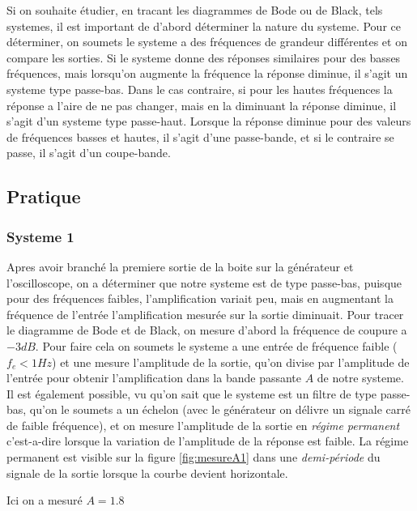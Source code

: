 \documentclass[12pt, a4paper]{report}
\begin{document}
Si on souhaite étudier, en tracant les diagrammes de Bode ou de Black, tels
systemes, il est important de d'abord déterminer la nature du systeme. Pour ce 
déterminer, on soumets le systeme a des fréquences de grandeur différentes et on
compare les sorties. Si le systeme donne des réponses similaires pour des basses fréquences,
mais lorsqu'on augmente la fréquence la réponse diminue, il s'agit un systeme type passe-bas. Dans le cas contraire,
si pour les hautes fréquences la réponse a l'aire de ne pas changer, mais en la diminuant la réponse diminue, il s'agit d'un systeme type
passe-haut. Lorsque la réponse diminue pour des valeurs de fréquences basses et hautes, il s'agit d'une passe-bande,
et si le contraire se passe, il s'agit d'un coupe-bande.

\subsection{Pratique}
\subsubsection{Systeme 1}

Apres avoir branché la premiere sortie de la boite sur la générateur et l'oscilloscope, on a déterminer que
notre systeme est de type passe-bas, puisque pour des fréquences faibles, l'amplification variait peu, mais en augmentant
la fréquence de l'entrée l'amplification mesurée sur la sortie diminuait. Pour tracer le diagramme de 
Bode et de Black, on mesure d'abord la fréquence de coupure a $-3 dB$. Pour faire cela on soumets le systeme a 
une entrée de fréquence faible ($f_e < 1 Hz$) et une mesure l'amplitude de la sortie, qu'on divise par l'amplitude 
de l'entrée pour obtenir l'amplification dans la bande passante $A$ de notre systeme. Il est également possible, 
vu qu'on sait que le systeme est un filtre de type passe-bas, qu'on le soumets a un échelon
(avec le générateur on délivre un signale carré de faible fréquence), et on mesure l'amplitude de  
la sortie en \textit{régime permanent} c'est-a-dire lorsque la variation de l'amplitude de la réponse 
est faible. La régime permanent est visible sur la figure \ref{fig:mesureA1}
dans une \textit{demi-période} du signale de la sortie lorsque la courbe devient horizontale.
\par

Ici on a mesuré $A = 1.8$
\end{document}
